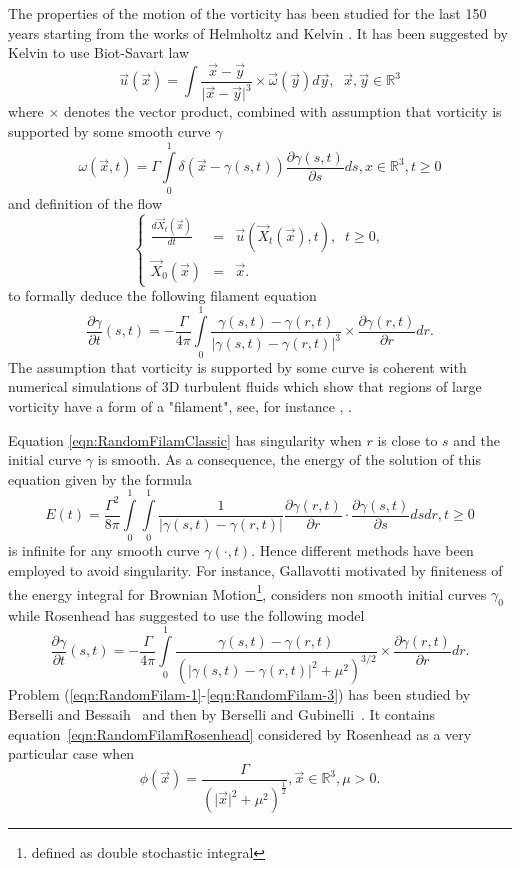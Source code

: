 \documentclass[11pt,a4paper,leqno]{amsart}%
\newcommand\half{\frac12}
\theoremstyle{plain}
\theoremstyle{remark}
\theoremstyle{plain}
\numberwithin{equation}{section}
\begin{document}
The properties of the motion of the vorticity has been studied for the last 150 years starting from the works of
Helmholtz \cite{Helm1858} and Kelvin \cite{Kelvin1869}. It has been suggested by Kelvin  to use Biot-Savart law
\[
\vec{u}(\vec{x})=\int\frac{\vec{x}-\vec{y}}{\vert \vec{x}-\vec{y}\vert^3}\times\vec{\omega}(\vec{y})d\vec{y},\;\;\vec{x},\vec{y}\in\mathbb{R}^3
\]
where $\times$ denotes the vector product, 
combined with assumption that vorticity is supported by some smooth curve $\gamma$
\[
\omega(\vec{x},t)=\Gamma\int\limits_0^1\delta(\vec{x}-\gamma(s,t))\frac{\partial \gamma(s,t)}{\partial s}ds,x\in\mathbb{R}^3,t\geq 0
\]
and definition of the flow
\begin{equation}\label{equa21}
\left\{
\begin{array}{rcl}
\frac{d \vec{X}_t(\vec{x})}{dt}&=&\vec{u}(\vec{X}_t(\vec{x}),t),\;\;t\geq 0,\\
\vec{X}_0(\vec{x})&=&\vec{x}.
\end{array}
\right.
\end{equation}
to formally deduce the following filament equation
\begin{equation}\label{eqn:RandomFilamClassic}
\frac{\partial \gamma}{\partial t}(s,t)=-\frac{\Gamma}{4\pi}\int\limits_0^1\frac{\gamma(s,t)-\gamma(r,t)}{\vert \gamma(s,t)-\gamma(r,t)\vert^3}\times\frac{\partial\gamma(r,t)}{\partial r}dr.
\end{equation}
The assumption that vorticity is supported by some curve is coherent with numerical simulations of 3D turbulent fluids
which show that regions of large  vorticity   have a form of a
"filament", see, for instance \cite{[Bell+Markus_1992]},
\cite{[VincMeneguzzi-1991]}.

Equation \eqref{eqn:RandomFilamClassic} has singularity when $r$ is close to $s$ and the initial curve $\gamma$ is smooth.
As a consequence, the energy of the solution of this equation given by the formula
\[
E(t)=\frac{\Gamma^2}{8\pi}\int\limits_0^1\int\limits_0^1\frac{1}{\vert \gamma(s,t)-\gamma(r,t)\vert }\frac{\partial \gamma(r,t)}{\partial r}\cdot\frac{\partial \gamma(s,t)}{\partial s}dsdr,t\geq 0
\]
is infinite for any smooth curve $\gamma(\cdot,t)$.
Hence different methods have been  employed to avoid  singularity. For instance, Gallavotti \cite{Gallavotti} motivated by finiteness of the energy integral
for Brownian Motion\footnote{defined as double stochastic integral},
considers non smooth initial curves $\gamma_0$ while
Rosenhead \cite{[Rosenhead-1930]}  has suggested to use the following model
\begin{equation}\label{eqn:RandomFilamRosenhead}
\frac{\partial \gamma}{\partial t}(s,t)=-\frac{\Gamma}{4\pi}\int\limits_0^1\frac{\gamma(s,t)-\gamma(r,t)}{(\vert \gamma(s,t)-\gamma(r,t)\vert^2+\mu^2)^{3/2}}\times\frac{\partial\gamma(r,t)}{\partial r}dr.
\end{equation}
 Problem (\eqref{eqn:RandomFilam-1}-\eqref{eqn:RandomFilam-3}) has been studied  by Berselli and Bessaih~\cite{[Bers+Bess_2002]} and then by Berselli and Gubinelli~\cite{[Bers+Gub_2007]}.
It contains equation~\eqref{eqn:RandomFilamRosenhead} considered by Rosenhead as a very particular case when
\[
\phi(\vec{x})=\frac{\Gamma}{(\vert \vec{x}\vert^2+\mu^2)^{\half}},\vec{x}\in\mathbb{R}^3,\mu>0.
\]
\end{document}
